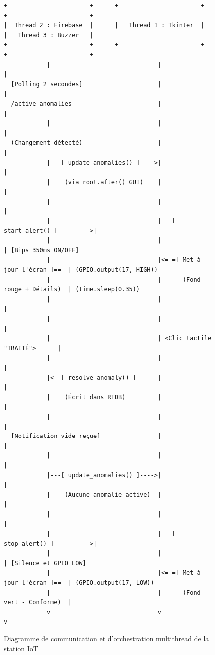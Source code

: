 \begin{figure}[H]
\centering
\begin{verbatim}
+-----------------------+      +-----------------------+      +-----------------------+
|  Thread 2 : Firebase  |      |   Thread 1 : Tkinter  |      |   Thread 3 : Buzzer   |
+-----------------------+      +-----------------------+      +-----------------------+
            |                              |                              |
  [Polling 2 secondes]                     |                              |
  /active_anomalies                        |                              |
            |                              |                              |
  (Changement détecté)                     |                              |
            |---[ update_anomalies() ]---->|                              |
            |    (via root.after() GUI)    |                              |
            |                              |                              |
            |                              |---[ start_alert() ]--------->|
            |                              |                              | [Bips 350ms ON/OFF]
            |                              |<=-=[ Met à jour l'écran ]==  | (GPIO.output(17, HIGH))
            |                              |      (Fond rouge + Détails)  | (time.sleep(0.35))
            |                              |                              |
            |                              |                              |
            |                              | <Clic tactile "TRAITÉ">      |
            |                              |                              |
            |<--[ resolve_anomaly() ]------|                              |
            |    (Écrit dans RTDB)         |                              |
            |                              |                              |
  [Notification vide reçue]                |                              |
            |                              |                              |
            |---[ update_anomalies() ]---->|                              |
            |    (Aucune anomalie active)  |                              |
            |                              |                              |
            |                              |---[ stop_alert() ]---------->|
            |                              |                              | [Silence et GPIO LOW]
            |                              |<=-=[ Met à jour l'écran ]==  | (GPIO.output(17, LOW))
            |                              |      (Fond vert - Conforme)  |
            v                              v                              v
\end{verbatim}
\caption{Diagramme de communication et d'orchestration multithread de la station IoT}
\label{fig:multithread-diagram}
\end{figure}

